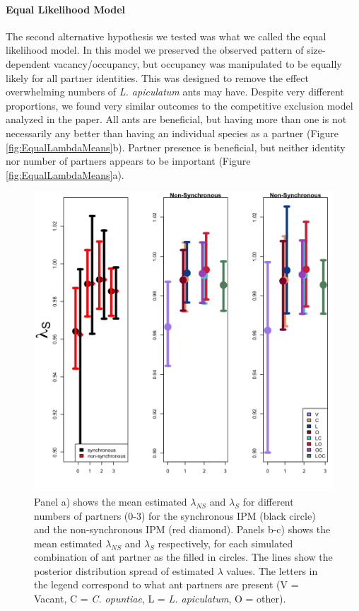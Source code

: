 \documentclass[11pt]{article}
\begin{document}
\paragraph{Equal Likelihood Model}
The second alternative hypothesis we tested was what we called the equal likelihood model.
In this model we preserved the observed pattern of size-dependent vacancy/occupancy, but occupancy was manipulated to be equally likely for all partner identities. 
This was designed to remove the effect overwhelming numbers of \textit{L. apiculatum} ants may have. 
Despite very different proportions, we found very similar outcomes to the competitive exclusion model analyzed in the paper. 
All ants are beneficial, but having more than one is not necessarily any better than having an individual species as a partner (Figure \ref{fig:EqualLambdaMeans}b).
Partner presence is beneficial, but neither identity nor number of partners appears to be important (Figure \ref{fig:EqualLambdaMeans}a).

\begin{figure}
\includegraphics[width=0.91\linewidth]{Figures/Lambdas_equal_lines.png}
	\caption{Panel a) shows the mean estimated $\lambda_{NS}$ and $\lambda_{S}$ for different numbers of partners (0-3) for the synchronous IPM (black circle) and the non-synchronous IPM (red diamond). Panels b-c) shows the mean estimated $\lambda_{NS}$ and $\lambda_{S}$ respectively, for each simulated combination of ant partner as the filled in circles. The lines show the posterior distribution spread of estimated $\lambda$ values. The letters in the legend correspond to what ant partners are present (V = Vacant, C = \textit{C. opuntiae}, L = \textit{L. apiculatum}, O = other). }
\label{app:EqualLambdaMeans}
\end{figure}
\end{document}
